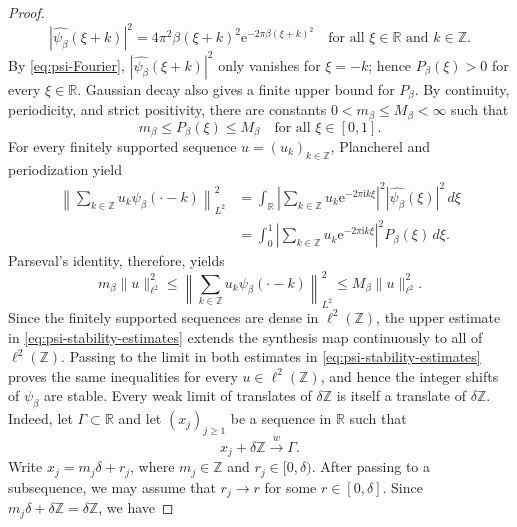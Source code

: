 \documentclass[11pt]{amsart}
\numberwithin{equation}{section}
\theoremstyle{definition}
\theoremstyle{remark}
\newcommand{\R}{\mathbb R}
\newcommand{\Z}{\mathbb Z}
\newcommand{\ii}{\mathrm i}
\newcommand{\e}{\mathrm e}
\begin{document}
\begin{proof}
        \begin{equation}
            |\widehat{\psi_\beta}(\xi+k)|^2
            =4\pi^2\beta(\xi+k)^2\e^{-2\pi\beta(\xi+k)^2}
            \quad\text{for all }\xi\in\R\text{ and }k\in\Z.
        \end{equation}
        By \eqref{eq:psi-Fourier}, $|\widehat{\psi_\beta}(\xi+k)|^2$ only vanishes for $\xi=-k$; hence $P_\beta(\xi)>0$ for every $\xi\in\R$. Gaussian decay also gives a finite upper bound for $P_\beta$. By continuity, periodicity, and strict positivity, there are constants $0<m_\beta\leq M_\beta<\infty$ such that
        \begin{equation}
            m_\beta\leq P_\beta(\xi)\leq M_\beta
            \quad\text{for all }\xi\in[0,1].
        \end{equation}
        For every finitely supported sequence $u=(u_k)_{k\in\Z}$, Plancherel and periodization yield
        \begin{align}\label{eq:periodized-synthesis-norm}
            \left\|\sum_{k\in\Z}u_k \psi_\beta(\cdot-k)\right\|_{L^2}^2
            &= \int_\R \left|\sum_{k\in\Z}u_k\e^{-2\pi\ii k\xi}\right|^2 |\widehat{\psi_\beta}(\xi)|^2\,d\xi \\
            &= \int_0^1 \left|\sum_{k\in\Z}u_k\e^{-2\pi\ii k\xi}\right|^2 P_\beta(\xi)\,d\xi.
        \end{align}
        Parseval's identity, therefore, yields
        \begin{equation}\label{eq:psi-stability-estimates}
            m_\beta\|u\|_{\ell^2}^2
            \leq
            \left\|\sum_{k\in\Z}u_k\psi_\beta(\cdot-k)\right\|_{L^2}^2
            \leq
            M_\beta\|u\|_{\ell^2}^2.
        \end{equation}
        Since the finitely supported sequences are dense in $\ell^2(\Z)$, the upper estimate in \eqref{eq:psi-stability-estimates} extends the synthesis map continuously to all of $\ell^2(\Z)$. Passing to the limit in both estimates in \eqref{eq:psi-stability-estimates} proves the same inequalities for every $u\in\ell^2(\Z)$, and hence the integer shifts of $\psi_\beta$ are stable. Every weak limit of translates of $\delta\Z$ is itself a translate of $\delta\Z$. Indeed, let $\Gamma\subset\R$ and let $(x_j)_{j\geq1}$ be a sequence in $\R$ such that
        \begin{equation}\label{eq:weak-limit-Gamma}
            x_j+\delta\Z \xrightarrow{w} \Gamma.
        \end{equation}
        Write $x_j=m_j\delta+r_j$, where $m_j\in\Z$ and $r_j\in[0,\delta)$. After passing to a subsequence, we may assume that $r_j\to r$ for some $r\in[0,\delta]$. Since $m_j\delta+\delta\Z=\delta\Z$, we have

\end{proof}
\end{document}
